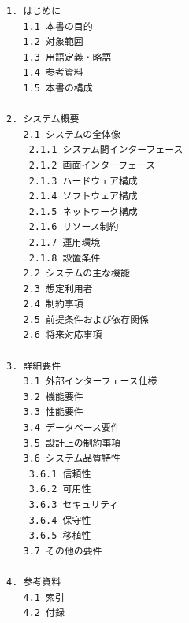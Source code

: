 \begin{figure}[tp]
\begin{tcolorbox}[
  colback=white,
  colframe=black,
  fonttitle=\bfseries,
]
\footnotesize
\ttfamily
\fontsize{10}{11}\selectfont
\begin{verbatim}
1. はじめに
   1.1 本書の目的
   1.2 対象範囲
   1.3 用語定義・略語
   1.4 参考資料
   1.5 本書の構成

2. システム概要
   2.1 システムの全体像
    2.1.1 システム間インターフェース
    2.1.2 画面インターフェース
    2.1.3 ハードウェア構成
    2.1.4 ソフトウェア構成
    2.1.5 ネットワーク構成
    2.1.6 リソース制約
    2.1.7 運用環境
    2.1.8 設置条件
   2.2 システムの主な機能
   2.3 想定利用者
   2.4 制約事項
   2.5 前提条件および依存関係
   2.6 将来対応事項

3. 詳細要件
   3.1 外部インターフェース仕様
   3.2 機能要件
   3.3 性能要件
   3.4 データベース要件
   3.5 設計上の制約事項
   3.6 システム品質特性
    3.6.1 信頼性
    3.6.2 可用性
    3.6.3 セキュリティ
    3.6.4 保守性
    3.6.5 移植性
   3.7 その他の要件

4. 参考資料
   4.1 索引
   4.2 付録
\end{verbatim}
\end{tcolorbox}
\par\vspace{-20pt}
\label{fig:ieee830}
\end{figure}



